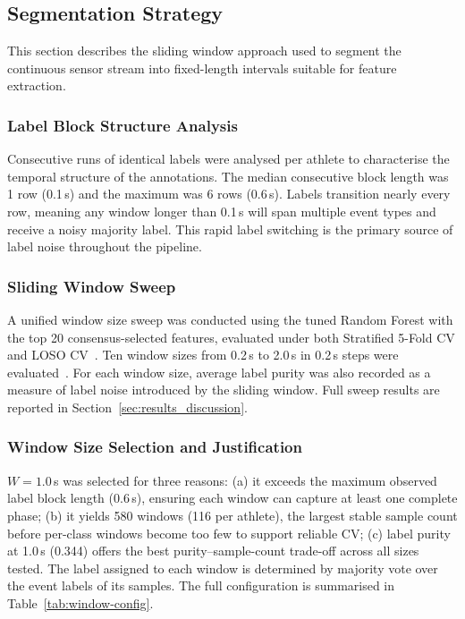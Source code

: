 \documentclass[12pt,a4paper]{cibb}
\begin{document}
\subsection{Segmentation Strategy}
\label{sec:WINDOWING}
This section describes the sliding window approach used to segment the continuous sensor stream into fixed-length intervals suitable for feature extraction.

\subsubsection{Label Block Structure Analysis}
Consecutive runs of identical labels were analysed per athlete to characterise the temporal structure of the annotations. The median consecutive block length was 1 row (0.1\,s) and the maximum was 6 rows (0.6\,s). Labels transition nearly every row, meaning any window longer than 0.1\,s will span multiple event types and receive a noisy majority label. This rapid label switching is the primary source of label noise throughout the pipeline.

\subsubsection{Sliding Window Sweep}
A unified window size sweep was conducted using the tuned Random Forest with the top 20 consensus-selected features, evaluated under both Stratified 5-Fold CV and LOSO CV~\cite{10962074}. Ten window sizes from 0.2\,s to 2.0\,s in 0.2\,s steps were evaluated~\cite{10689691}. For each window size, average label purity was also recorded as a measure of label noise introduced by the sliding window. Full sweep results are reported in Section~\ref{sec:results_discussion}.

\subsubsection{Window Size Selection and Justification}
$W = 1.0$\,s was selected for three reasons: (a) it exceeds the maximum observed label block length (0.6\,s), ensuring each window can capture at least one complete phase; (b) it yields 580 windows (116 per athlete), the largest stable sample count before per-class windows become too few to support reliable CV; (c) label purity at 1.0\,s (0.344) offers the best purity--sample-count trade-off across all sizes tested. The label assigned to each window is determined by majority vote over the event labels of its samples. The full configuration is summarised in Table~\ref{tab:window-config}.
\end{document}
